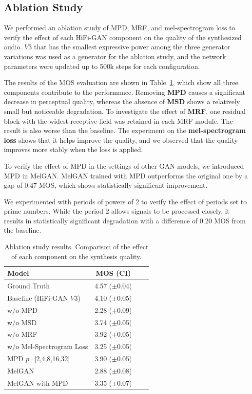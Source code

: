\subsection{Ablation Study}
We performed an ablation study of MPD, MRF, and mel-spectrogram loss to verify the effect of each HiFi-GAN component on the quality of the synthesized audio.
$V3$ that has the smallest expressive power among the three generator variations was used as a generator for the ablation study, and the network parameters were updated up to 500k steps for each configuration.

The results of the MOS evaluation are shown in Table~\ref{tab:ablation-study}, which show all three components contribute to the performance. Removing \textbf{MPD} causes a significant decrease in perceptual quality, whereas the absence of \textbf{MSD} shows a relatively small but noticeable degradation.
To investigate the effect of \textbf{MRF}, one residual block with the widest receptive field was retained in each MRF module. The result is also worse than the baseline. 
The experiment on the \textbf{mel-spectrogram loss} shows that it helps improve the quality, and we observed that the quality improves more stably when the loss is applied.

To verify the effect of MPD in the settings of other GAN models, we introduced MPD in MelGAN. MelGAN trained with MPD outperforms the original one by a gap of 0.47 MOS, which shows statistically significant improvement.

We experimented with periods of powers of 2 to verify the effect of periods set to prime numbers. While the period 2 allows signals to be processed closely, it results in statistically significant degradation with a difference of 0.20 MOS from the baseline.

\begin{table}[ht]
  \protect\caption{Ablation study results. Comparison of the effect of each component on the synthesis quality.}
  \label{tab:ablation-study}
  \centering
  \begin{tabular}[htbp]{lcrr}
    \toprule
    Model\hspace{2.5cm}   & \hspace{0.5cm}MOS (CI)\hspace{0.5cm} \\
    \midrule
    Ground Truth  & 4.57 ($\pm$0.04) \\
    \midrule
    Baseline (HiFi-GAN $V3$) & 4.10 ($\pm$0.05) \\
    \midrule 
    w/o MPD     & 2.28 ($\pm$0.09) \\
    w/o MSD     & 3.74 ($\pm$0.05) \\
    w/o MRF    & 3.92  ($\pm$0.05) \\
    w/o Mel-Spectrogram Loss    & 3.25  ($\pm$0.05) \\
    MPD $p$=[2,4,8,16,32]    & 3.90  ($\pm$0.05) \\
    \midrule[0.8pt]
    MelGAN     & 2.88 ($\pm$0.08) \\
    MelGAN with MPD     & 3.35 ($\pm$0.07) \\
    \bottomrule
  \end{tabular}
\end{table}

